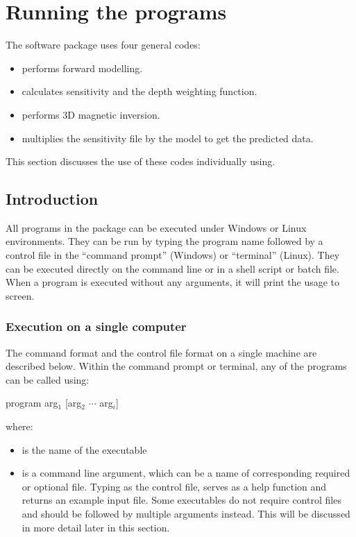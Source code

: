 \section{Running the programs}

The software package \programName uses four general codes:
\begin{itemize}
\item[\codeName{MAGFOR3D}] performs forward modelling.
\item[\codeName{MAGSEN3D}] calculates sensitivity and the depth weighting function.
\item[\codeName{MAGINV3D}] performs 3D magnetic inversion.
\item[\codeName{MAGPRE3D}] multiplies the sensitivity file by the model to get the predicted data.	
\end{itemize}
This section discusses the use of these codes individually using.

\subsection{Introduction}
All programs in the package can be executed under Windows or Linux environments. They can be run by typing the program name followed by a control file in the ``command prompt'' (Windows) or ``terminal'' (Linux). They can be executed directly on the command line or in a shell script or batch file. When a program is executed without any arguments, it will print the usage to screen.

\subsubsection{Execution on a single computer}
The command format and the control file format on a single machine are described below. Within the command prompt or terminal, any of the programs can be called using:
\begin{fileExample}
program arg$_1$ [arg$_2$ $\cdots$ arg$_i$]
\end{fileExample}
%
where:
\begin{itemize}
\item[\codeName{program}] is the name of the executable
\item[\codeName{arg$_i$}] is a command line argument, which can be a name of corresponding required or optional file. Typing  as the control file, serves as a help function and returns an example input file. Some executables do not require control files and should be followed by multiple arguments instead. This will be discussed in more detail later in this section.
\end{itemize}

